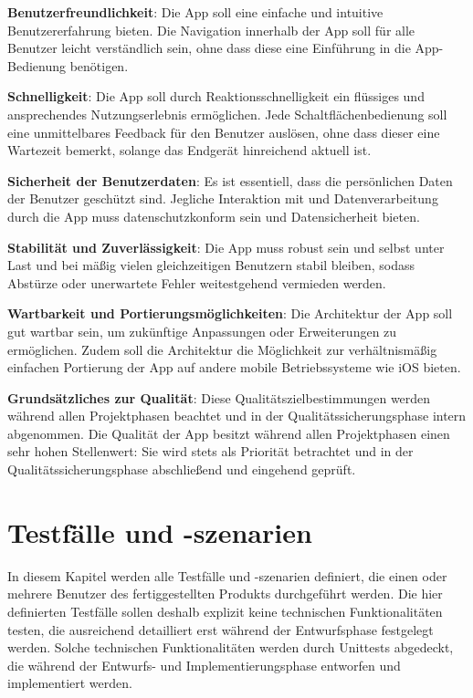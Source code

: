 \documentclass[oneside, ngerman]{sdqtechreport}
\begin{document}
\textbf{Benutzerfreundlichkeit}: Die App soll eine einfache und intuitive Benutzererfahrung bieten. Die Navigation innerhalb der App soll für alle Benutzer leicht verständlich sein, ohne dass diese eine Einführung in die App-Bedienung benötigen.

\textbf{Schnelligkeit}: Die App soll durch Reaktionsschnelligkeit ein flüssiges und ansprechendes Nutzungserlebnis ermöglichen. Jede Schaltflächenbedienung soll eine unmittelbares Feedback für den Benutzer auslösen, ohne dass dieser eine Wartezeit bemerkt, solange das Endgerät hinreichend aktuell ist.

\textbf{Sicherheit der Benutzerdaten}: Es ist essentiell, dass die persönlichen Daten der Benutzer geschützt sind. Jegliche Interaktion mit und Datenverarbeitung durch die App muss datenschutzkonform sein und Datensicherheit bieten.

\textbf{Stabilität und Zuverlässigkeit}: Die App muss robust sein und selbst unter Last und bei mäßig vielen gleichzeitigen Benutzern stabil bleiben, sodass Abstürze oder unerwartete Fehler weitestgehend vermieden werden.

\textbf{Wartbarkeit und Portierungsmöglichkeiten}: Die Architektur der App soll gut wartbar sein, um zukünftige Anpassungen oder Erweiterungen zu ermöglichen. Zudem soll die Architektur die Möglichkeit zur verhältnismäßig einfachen Portierung der App auf andere mobile Betriebssysteme wie iOS bieten. 

\textbf{Grundsätzliches zur Qualität}: Diese Qualitätszielbestimmungen werden während allen Projektphasen beachtet und in der Qualitätssicherungsphase intern abgenommen. Die Qualität der App besitzt während allen Projektphasen einen sehr hohen Stellenwert: Sie wird stets als Priorität betrachtet und in der Qualitätssicherungsphase abschließend und eingehend geprüft.



\chapter{Testfälle und -szenarien}
\label{chap:Tests}

In diesem Kapitel werden alle Testfälle und -szenarien definiert, die einen oder mehrere Benutzer des fertiggestellten Produkts durchgeführt werden. Die hier definierten Testfälle sollen deshalb explizit keine technischen Funktionalitäten testen, die ausreichend detailliert erst während der Entwurfsphase festgelegt werden. Solche technischen Funktionalitäten werden durch Unittests abgedeckt, die während der Entwurfs- und Implementierungsphase entworfen und implementiert werden.
\end{document}
